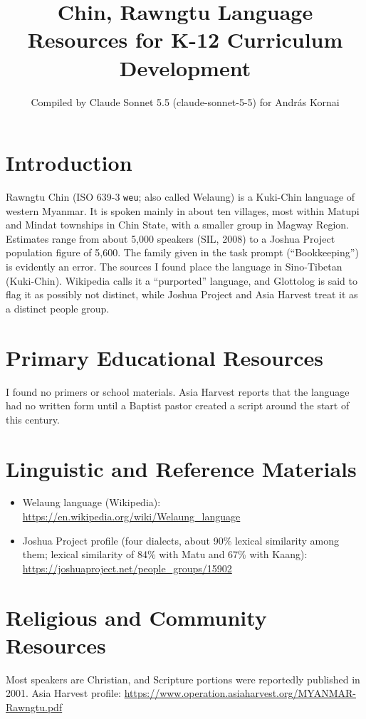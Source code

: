 \documentclass[12pt]{article}
\title{Chin, Rawngtu Language Resources for K-12 Curriculum Development}
\author{Compiled by Claude Sonnet 5.5 (claude-sonnet-5-5) for Andr\'as Kornai}
\date{}
\begin{document}
\maketitle

\section{Introduction}
Rawngtu Chin (ISO 639-3 \texttt{weu}; also called Welaung) is a Kuki-Chin language of western Myanmar. It is spoken mainly in about ten villages, most within Matupi and Mindat townships in Chin State, with a smaller group in Magway Region. Estimates range from about 5,000 speakers (SIL, 2008) to a Joshua Project population figure of 5,600. The family given in the task prompt (``Bookkeeping'') is evidently an error. The sources I found place the language in Sino-Tibetan (Kuki-Chin). Wikipedia calls it a ``purported'' language, and Glottolog is said to flag it as possibly not distinct, while Joshua Project and Asia Harvest treat it as a distinct people group.

\section{Primary Educational Resources}
I found no primers or school materials. Asia Harvest reports that the language had no written form until a Baptist pastor created a script around the start of this century.

\section{Linguistic and Reference Materials}
\begin{itemize}
\item Welaung language (Wikipedia): \url{https://en.wikipedia.org/wiki/Welaung_language}
\item Joshua Project profile (four dialects, about 90\% lexical similarity among them; lexical similarity of 84\% with Matu and 67\% with Kaang): \url{https://joshuaproject.net/people_groups/15902}
\end{itemize}

\section{Religious and Community Resources}
Most speakers are Christian, and Scripture portions were reportedly published in 2001. Asia Harvest profile: \url{https://www.operation.asiaharvest.org/MYANMAR-Rawngtu.pdf}
\end{document}
